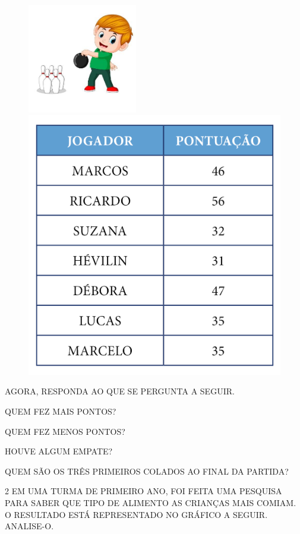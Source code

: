\begin{figure}[htpb!]
\centering
\includegraphics[width=1.88542in,height=1.88542in]{media/image95.jpg}
\includegraphics[width=.5\textwidth]{../ilustracoes/MAT1/SAEB_1ANO_MAT_FIGURA96.png}
\end{figure}

AGORA, RESPONDA AO QUE SE PERGUNTA A SEGUIR.

\begin{escolha}
\item QUEM FEZ MAIS PONTOS?


\item QUEM FEZ MENOS PONTOS?


\item HOUVE ALGUM EMPATE?


\item QUEM SÃO OS TRÊS PRIMEIROS COLADOS AO FINAL DA PARTIDA?

\end{escolha}

\pagebreak
\num{2} EM UMA TURMA DE PRIMEIRO ANO, FOI FEITA UMA PESQUISA PARA SABER QUE TIPO DE ALIMENTO AS
CRIANÇAS MAIS COMIAM. O RESULTADO ESTÁ REPRESENTADO NO GRÁFICO A SEGUIR. ANALISE-O.

